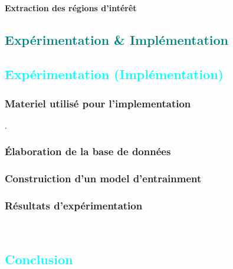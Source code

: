 \subsection{Extraction des régions d'intérêt}
	\lipsum[1]




\textcolor{teal}{\part{Expérimentation \& Implémentation}}

\textcolor{cyan}{\chapter{Expérimentation (Implémentation) }}
\section{Materiel utilisé pour l'implementation}
	\lipsum[1].
\section{Élaboration de la base de données}
	\lipsum[1]

\section{Construiction d'un model d'entrainment}
	\lipsum[1]
\section{Résultats d'expérimentation}
	\lipsum[1] 
	\\
	\lipsum[1]


\textcolor{cyan}{\chapter{Conclusion}}
	\lipsum[2]
	\\ \\
	\lipsum[3]







